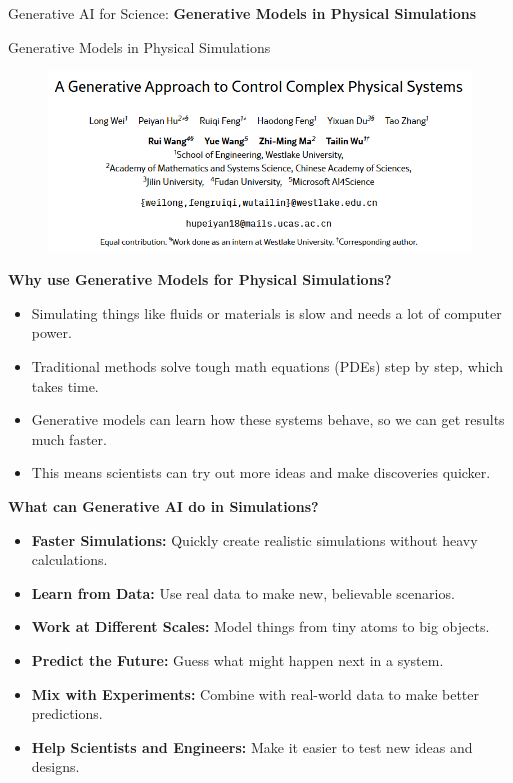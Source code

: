 \begin{frame}{}
    \LARGE Generative AI for Science: \textbf{Generative Models in Physical Simulations}
\end{frame}

\begin{frame}[allowframebreaks]{Generative Models in Physical Simulations}
    \begin{figure}
        \centering
        \includegraphics[height=0.9\textheight,width=1\textwidth,keepaspectratio]{images/science/generative-models-cover.png}
    \end{figure}

    \framebreak

    \textbf{Why use Generative Models for Physical Simulations?}

    \begin{itemize}
        \item Simulating things like fluids or materials is slow and needs a lot of computer power.
        \item Traditional methods solve tough math equations (PDEs) step by step, which takes time.
        \item Generative models can learn how these systems behave, so we can get results much faster.
        \item This means scientists can try out more ideas and make discoveries quicker.
    \end{itemize}

    \framebreak

    \textbf{What can Generative AI do in Simulations?}
    \begin{itemize}
        \item \textbf{Faster Simulations:} Quickly create realistic simulations without heavy calculations.
        \item \textbf{Learn from Data:} Use real data to make new, believable scenarios.
        \item \textbf{Work at Different Scales:} Model things from tiny atoms to big objects.
        \item \textbf{Predict the Future:} Guess what might happen next in a system.
        \item \textbf{Mix with Experiments:} Combine with real-world data to make better predictions.
        \item \textbf{Help Scientists and Engineers:} Make it easier to test new ideas and designs.
    \end{itemize}


\end{frame}
